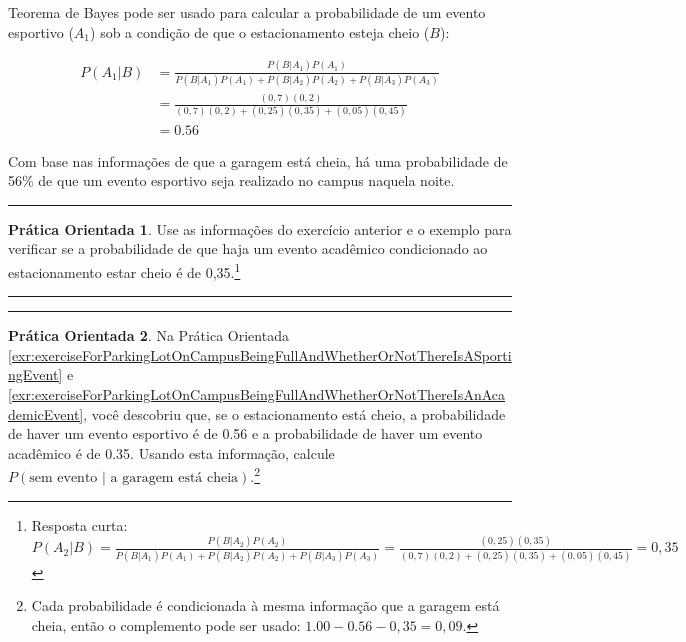 \documentclass[
]{book}
\theoremstyle{definition}
\theoremstyle{definition}
\theoremstyle{definition}
\newtheorem{exercise}{Prática Orientada}[chapter]
\theoremstyle{definition}
\theoremstyle{remark}
\begin{document}
Teorema de Bayes pode ser usado para calcular a probabilidade de um evento esportivo (\(A_1\)) sob a condição de que o estacionamento esteja cheio (\(B\)):

\begin{align*}
P(A_1 | B) &= \frac{P(B | A_1) P(A_1)}{P(B | A_1) P(A_1) + P(B | A_2) P(A_2) + P(B | A_3) P(A_3)} \\
        &= \frac{(0,7)(0,2)}{(0,7)(0,2) + (0,25)(0,35) + (0,05)(0,45)} \\
        &= 0.56 
\end{align*}

Com base nas informações de que a garagem está cheia, há uma probabilidade de 56\% de que um evento esportivo seja realizado no campus naquela noite.

\begin{center}\rule{0.5\linewidth}{0.5pt}\end{center}

\begin{exercise}
\protect\hypertarget{exr:exerciseForParkingLotOnCampusBeingFullAndWhetherOrNotThereIsAnAcademicEvent}{}{\label{exr:exerciseForParkingLotOnCampusBeingFullAndWhetherOrNotThereIsAnAcademicEvent} }Use as informações do exercício anterior e o exemplo para verificar se a probabilidade de que haja um evento acadêmico condicionado ao estacionamento estar cheio é de 0,35.\footnote{Resposta curta: \(P(A_2 | B) = \frac{P(B | A_2) P(A_2)}{P(B | A_1) P(A_1) + P(B | A_2) P(A_2) + P(B | A_3) P(A_3)} = \frac{(0,25)(0,35)}{(0,7)(0,2) + (0,25)(0,35) + (0,05)(0,45)} = 0,35\)}
\end{exercise}

\begin{center}\rule{0.5\linewidth}{0.5pt}\end{center}

\begin{center}\rule{0.5\linewidth}{0.5pt}\end{center}

\begin{exercise}
\protect\hypertarget{exr:exerciseForParkingLotOnCampusBeingFullAndWhetherOrNotThereIsNoEvent}{}{\label{exr:exerciseForParkingLotOnCampusBeingFullAndWhetherOrNotThereIsNoEvent} }Na Prática Orientada \ref{exr:exerciseForParkingLotOnCampusBeingFullAndWhetherOrNotThereIsASportingEvent} e \ref{exr:exerciseForParkingLotOnCampusBeingFullAndWhetherOrNotThereIsAnAcademicEvent}, você descobriu que, se o estacionamento está cheio, a probabilidade de haver um evento esportivo é de 0.56 e a probabilidade de haver um evento acadêmico é de 0.35. Usando esta informação, calcule \(P( \text{sem evento | a garagem está cheia})\).\footnote{Cada probabilidade é condicionada à mesma informação que a garagem está cheia, então o complemento pode ser usado: \(1.00 - 0.56 - 0,35 = 0,09\).}
\end{exercise}
\end{document}
